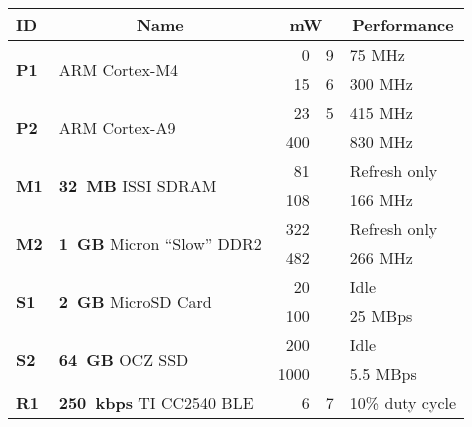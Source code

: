 \begin{table}[t]
\begin{threeparttable}
{\footnotesize
\begin{tabularx}{\columnwidth}{p{0.05in}lr@{.}lX}

\textbf{ID} &
\multicolumn{1}{c}{\textbf{Name}} &
\multicolumn{2}{c}{\textbf{mW}} &
\multicolumn{1}{c}{\textbf{Performance}}
\\ \toprule 

\multirow{2}{*}{\textbf{P1}} & \multirow{2}{*}{ARM Cortex-M4\tnote{1}~\cite{cortexm4-web}} &
0 & 9\tnote{2} &
75 MHz
\\

& &
15 & 6 &
300 MHz
\\ \cmidrule(lr){2-5}

\multirow{2}{*}{\textbf{P2}} & \multirow{2}{*}{ARM Cortex-A9~\cite{cortexa9-web}} &
23 & 5\tnote{2} &
415 MHz
\\

& &
400 & &
830 MHz
\\ \cmidrule(lr){1-5}

\multirow{2}{*}{\textbf{M1}} & \multirow{2}{*}{\textbf{32~MB} ISSI SDRAM~\cite{issi32MBsdram-datasheet}} &
81 & &
Refresh only
\\

& &
108 & &
166 MHz
\\ \cmidrule(lr){2-5}

\multirow{2}{*}{\textbf{M2}} & \multirow{2}{*}{\textbf{1~GB} Micron ``Slow'' DDR2} &
322 & \tnote{4} &
Refresh only
\\

& &
482 & &
266 MHz
\\ \cmidrule(lr){1-5}

\multirow{2}{*}{\textbf{S1}} & \multirow{2}{*}{\textbf{2~GB} MicroSD Card} &
20 & \tnote{5} &
Idle
\\

& &
100 & \tnote{5} &
25 MBps\tnote{6}
\\ \cmidrule(lr){2-5}

\multirow{2}{*}{\textbf{S2}} & \multirow{2}{*}{\textbf{64~GB} OCZ SSD} &
200 & \tnote{7} &
Idle
\\

& &
1000 & \tnote{7} &
5.5 MBps\tnote{7}
\\ \cmidrule(lr){1-5}

\multirow{2}{*}{\textbf{R1}} & \multirow{2}{*}{\textbf{250~kbps} TI CC2540 BLE} & 
6 & 7\tnote{3} &
10\% duty cycle\tnote{8}
\\


\end{tabularx}}
\end{threeparttable}
\end{table}
